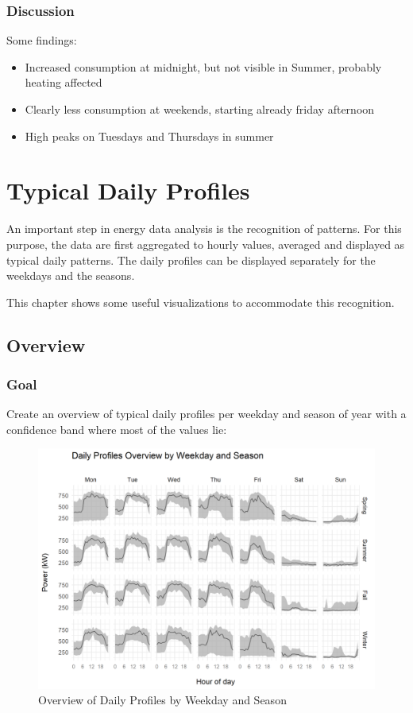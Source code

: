 \documentclass[
  a4paperpaper,
]{book}
\begin{document}
\hypertarget{discussion-6}{%
\subsection{Discussion}\label{discussion-6}}

Some findings:

\begin{itemize}
\item
  Increased consumption at midnight, but not visible in Summer, probably heating affected
\item
  Clearly less consumption at weekends, starting already friday afternoon
\item
  High peaks on Tuesdays and Thursdays in summer
\end{itemize}

\hypertarget{typical-daily-profiles}{%
\chapter{Typical Daily Profiles}\label{typical-daily-profiles}}

An important step in energy data analysis is the recognition of patterns. For this purpose, the data are first aggregated to hourly values, averaged and displayed as typical daily patterns. The daily profiles can be displayed separately for the weekdays and the seasons.

This chapter shows some useful visualizations to accommodate this recognition.

\newpage

\hypertarget{overview}{%
\section{Overview}\label{overview}}

\hypertarget{goal-8}{%
\subsection{Goal}\label{goal-8}}

Create an overview of typical daily profiles per weekday and season of year with a confidence band where most of the values lie:

\begin{figure}
\includegraphics[width=0.7\linewidth]{images/plotDailyProfOverview} \caption{Overview of Daily Profiles by Weekday and Season}\label{fig:unnamed-chunk-17}
\end{figure}
\end{document}
